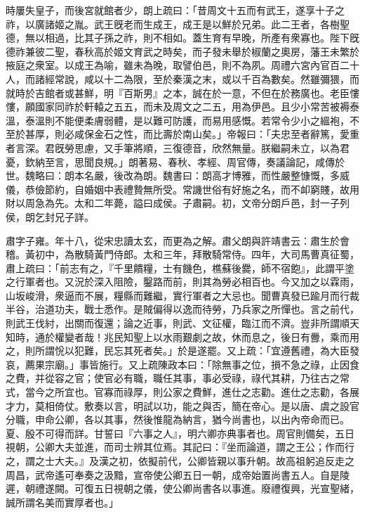 \begin{pinyinscope}
時屢失皇子，而後宮就館者少，朗上疏曰：「昔周文十五而有武王，遂享十子之祚，以廣諸姬之胤。武王旣老而生成王，成王是以鮮於兄弟。此二王者，各樹聖德，無以相過，比其子孫之祚，則不相如。蓋生育有早晚，所產有衆寡也。陛下旣德祚兼彼二聖，春秋高於姬文育武之時矣，而子發未舉於椒蘭之奧房，藩王未繁於掖庭之衆室。以成王為喻，雖未為晚，取譬伯邑，則不為夙。周禮六宮內官百二十人，而諸經常說，咸以十二為限，至於秦漢之末，或以千百為數矣。然雖彌猥，而就時於吉館者或甚鮮，明『百斯男』之本，誠在於一意，不但在於務廣也。老臣慺慺，願國家同祚於軒轅之五五，而未及周文之二五，用為伊邑。且少小常苦被褥泰溫，泰溫則不能便柔膚弱體，是以難可防護，而易用感慨。若常令少小之縕袍，不至於甚厚，則必咸保金石之性，而比壽於南山矣。」帝報曰：「夫忠至者辭篤，愛重者言深。君旣勞思慮，又手筆將順，三復德音，欣然無量。朕繼嗣未立，以為君憂，欽納至言，思聞良規。」朗著易、春秋、孝經、周官傳，奏議論記，咸傳於世。魏略曰：朗本名嚴，後改為朗。魏書曰：朗高才博雅，而性嚴整慷慨，多威儀，恭儉節約，自婚姻中表禮贄無所受。常譏世俗有好施之名，而不卹窮賤，故用財以周急為先。太和二年薨，謚曰成侯。子肅嗣。初，文帝分朗戶邑，封一子列侯，朗乞封兄子詳。

肅字子雍。年十八，從宋忠讀太玄，而更為之解。肅父朗與許靖書云：肅生於會稽。黃初中，為散騎黃門侍郎。太和三年，拜散騎常侍。四年，大司馬曹真征蜀，肅上疏曰：「前志有之，『千里饋糧，士有饑色，樵蘇後爨，師不宿飽』，此謂平塗之行軍者也。又況於深入阻險，鑿路而前，則其為勞必相百也。今又加之以霖雨，山坂峻滑，衆逼而不展，糧縣而難繼，實行軍者之大忌也。聞曹真發已踰月而行裁半谷，治道功夫，戰士悉作。是賊偏得以逸而待勞，乃兵家之所憚也。言之前代，則武王伐紂，出關而復還；論之近事，則武、文征權，臨江而不濟。豈非所謂順天知時，通於權變者哉！兆民知聖上以水雨艱劇之故，休而息之，後日有釁，乘而用之，則所謂恱以犯難，民忘其死者矣。」於是遂罷。又上疏：「宜遵舊禮，為大臣發哀，薦果宗廟。」事皆施行。又上疏陳政本曰：「除無事之位，損不急之祿，止因食之費，并從容之官；使官必有職，職任其事，事必受祿，祿代其耕，乃往古之常式，當今之所宜也。官寡而祿厚，則公家之費鮮，進仕之志勸。進仕之志勸，各展才力，莫相倚仗。敷奏以言，明試以功，能之與否，簡在帝心。是以唐、虞之設官分職，申命公卿，各以其事，然後惟龍為納言，猶今尚書也，以出內帝命而已。夏、殷不可得而詳。甘誓曰『六事之人』，明六卿亦典事者也。周官則備矣，五日視朝，公卿大夫並進，而司士辨其位焉。其記曰：『坐而論道，謂之王公；作而行之，謂之士大夫。』及漢之初，依擬前代，公卿皆親以事升朝。故高祖躬追反走之周昌，武帝遙可奉奏之汲黯，宣帝使公卿五日一朝，成帝始置尚書五人。自是陵遲，朝禮遂闕。可復五日視朝之儀，使公卿尚書各以事進。廢禮復興，光宣聖緒，誠所謂名美而實厚者也。」


\end{pinyinscope}
